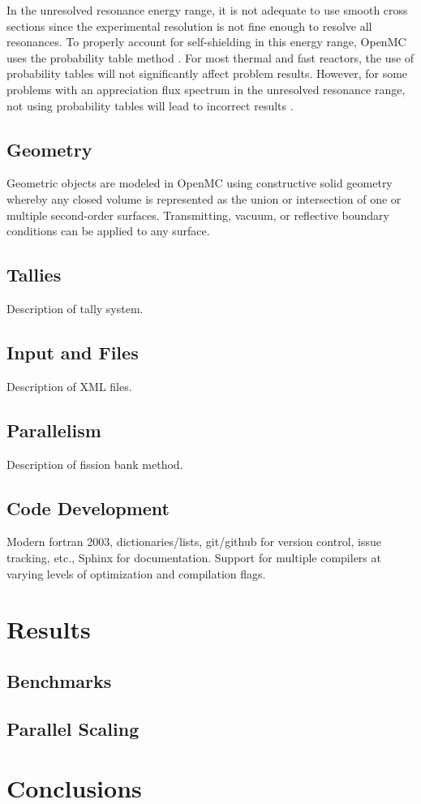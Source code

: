 \documentclass{elsarticle}
\begin{document}
In the unresolved resonance energy range, it is not adequate to use smooth cross
sections since the experimental resolution is not fine enough to resolve all
resonances. To properly account for self-shielding in this energy range, OpenMC
uses the probability table method \cite{probtables}. For most thermal and fast
reactors, the use of probability tables will not significantly affect problem
results. However, for some problems with an appreciation flux spectrum in the
unresolved resonance range, not using probability tables will lead to incorrect
results \cite{probtables-testing}.

\subsection{Geometry}

Geometric objects are modeled in OpenMC using constructive solid geometry
whereby any closed volume is represented as the union or intersection of one or
multiple second-order surfaces. Transmitting, vacuum, or reflective boundary
conditions can be applied to any surface. 

\subsection{Tallies}

Description of tally system.

\subsection{Input and Files}

Description of XML files.

\subsection{Parallelism}

Description of fission bank method.

\subsection{Code Development}

Modern fortran 2003, dictionaries/lists, git/github for version control, issue
tracking, etc., Sphinx for documentation. Support for multiple compilers at
varying levels of optimization and compilation flags.

\section{Results}

\subsection{Benchmarks}

\subsection{Parallel Scaling}

\section{Conclusions}



\end{document}
